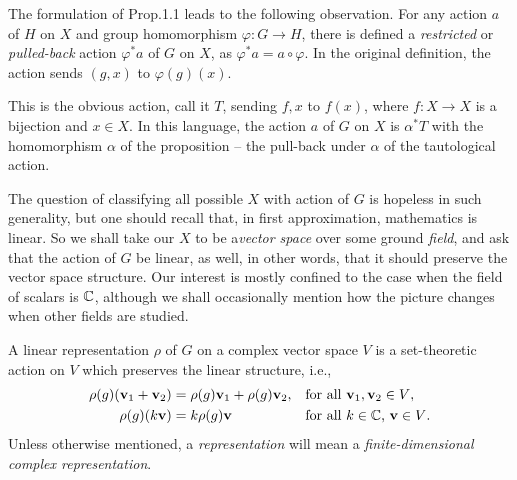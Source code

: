 The formulation of Prop.\@ 1.1 leads to the following observation. For any
action \(a\) of \(H\) on \(X\) and group homomorphism
\(\varphi\colon G\to H\), there is defined a \emph{restricted} or
\emph{pulled-back} action \(\varphi^*a\) of \(G\) on \(X\), as
\(\varphi^*a=a\circ\varphi\). In the original definition, the action sends
\((g,x)\) to \(\varphi(g)(x)\).

\begin{example}
  This is the obvious action, call it \(T\), sending \(f,x\) to \(f(x)\),
  where \(f\colon X\to X\) is a bijection and \(x\in X\). In this language,
  the action \(a\) of \(G\) on \(X\) is \(\alpha^*T\) with the homomorphism
  \(\alpha\) of the proposition -- the pull-back under \(\alpha\) of the
  tautological action.
\end{example}

\begin{example}[Linearity]
  The question of classifying all possible \(X\) with action of \(G\) is
  hopeless in such generality, but one should recall that, in first
  approximation, mathematics is linear. So we shall take our \(X\) to be
  a\emph{vector space} over some ground \emph{field}, and ask that the
  action of \(G\) be linear, as well, in other words, that it should
  preserve the vector space structure. Our interest is mostly confined to
  the case when the field of scalars is \(\mathbb{C}\), although we shall
  occasionally mention how the picture changes when other fields are
  studied.
\end{example}

\begin{definition}
  A linear representation \(\rho\) of \(G\) on a complex vector space \(V\)
  is a set-theoretic action on \(V\) which preserves the linear structure,
  i.e.,
  \begin{align*}
    \rho(g)(\mathbf{v}_1+\mathbf{v}_2)&=\rho(g)\mathbf{v}_1+\rho(g)\mathbf{v}_2,&&\text{for all
                                                          \(\mathbf{v}_1,\mathbf{v}_2\in
                                                          V\)},\\
    \rho(g)(k\mathbf{v})&=k\rho(g)\mathbf{v}&&\text{for all \(k\in\mathbb{C}\), \(\mathbf{v}\in V\).}
  \end{align*}
  Unless otherwise mentioned, a \emph{representation} will mean a
  \emph{finite-dimensional complex representation}.
\end{definition}

